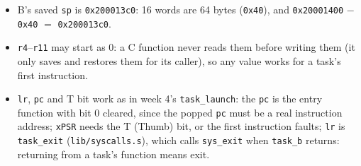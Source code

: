 \begin{itemize}
    \item B's saved \texttt{sp} is \texttt{0x200013c0}: 16 words are 64 bytes (\texttt{0x40}), and \texttt{0x20001400} $-$ \texttt{0x40} $=$ \texttt{0x200013c0}.
    \item \texttt{r4}--\texttt{r11} may start as 0: a C function never reads them before writing them (it only saves and restores them for its caller), so any value works for a task's first instruction.
    \item \texttt{lr}, \texttt{pc} and T bit work as in week 4's \texttt{task\_launch}: the \texttt{pc} is the entry function with bit 0 cleared, since the popped \texttt{pc} must be a real instruction address; \texttt{xPSR} needs the T (Thumb) bit, or the first instruction faults; \texttt{lr} is \texttt{task\_exit} (\texttt{lib/syscalls.s}), which calls \texttt{sys\_exit} when \texttt{task\_b} returns: returning from a task's function means exit.
\end{itemize}

